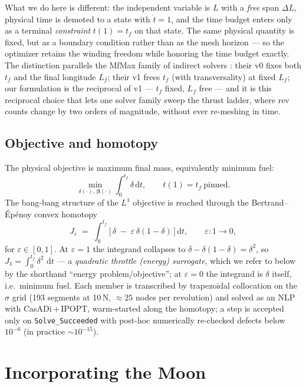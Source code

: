 \documentclass[11pt]{article}
\newcommand{\ud}{\,\mathrm{d}}
\newcommand{\vect}[1]{\bm{#1}}
\begin{document}
What we do here is different: the independent variable is $L$ with a
\emph{free} span $\Delta L$, physical time is demoted to a state with
$\dot t = 1$, and the time budget enters only as a terminal
\emph{constraint} $t(1) = t_f$ on that state. The same physical quantity
is fixed, but as a boundary condition rather than as the mesh horizon ---
so the optimizer retains the winding freedom while honoring the time
budget exactly. The distinction parallels the MfMax family of indirect
solvers \cite{HMG2004}: their v0 fixes both $t_f$ and the final longitude
$L_f$; their v1 frees $t_f$ (with transversality) at fixed $L_f$; our
formulation is the reciprocal of v1 --- $t_f$ fixed, $L_f$ free --- and it
is this reciprocal choice that lets one solver family sweep the thrust
ladder, where rev counts change by two orders of magnitude, without ever
re-meshing in time.

\subsection{Objective and homotopy}

The physical objective is maximum final mass, equivalently minimum fuel:
\begin{equation}
\min_{\delta(\cdot),\,\vect{\beta}(\cdot)} \int_0^{t_f} \delta \ud t ,
\qquad t(1) = t_f \ \text{pinned}.
\end{equation}
The bang-bang structure of the $L^1$ objective is reached through the
Bertrand--\'Ep\'enoy convex homotopy \cite{BE2002}
\begin{equation}
J_\varepsilon \;=\; \int_0^{t_f}
\bigl[\, \delta \;-\; \varepsilon\, \delta(1-\delta) \,\bigr] \ud t,
\qquad \varepsilon: 1 \to 0,
\end{equation}
for $\varepsilon \in [0,1]$. At $\varepsilon = 1$ the integrand collapses
to $\delta - \delta(1-\delta) = \delta^2$, so $J_1 = \int_0^{t_f}
\delta^2\,\ud t$ --- a \emph{quadratic throttle (energy) surrogate}, which
we refer to below by the shorthand ``energy problem/objective''; at
$\varepsilon = 0$ the integrand is $\delta$ itself, i.e.\ minimum fuel.
Each member is transcribed by
trapezoidal collocation on the $\sigma$ grid (193 segments at 10\,N,
$\approx 25$ nodes per revolution) and solved as an NLP with
CasADi\,+\,IPOPT, warm-started along the homotopy; a step is accepted only
on \texttt{Solve\_Succeeded} with post-hoc numerically re-checked defects
below $10^{-6}$ (in practice $\sim 10^{-15}$).

\section{Incorporating the Moon}
\end{document}
